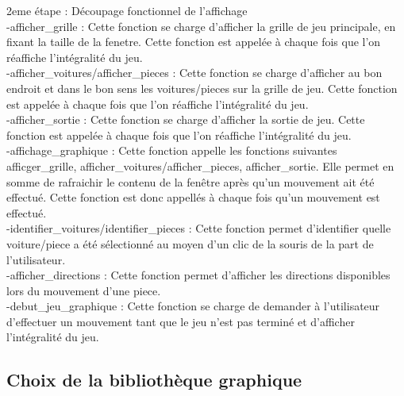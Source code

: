 \documentclass[20pt]{article}
\begin{document}
2eme étape : Découpage fonctionnel de l'affichage\\

-afficher\_grille : Cette fonction se charge d'afficher la grille de jeu principale, en fixant la taille de la fenetre. Cette fonction est appelée à chaque fois que l'on réaffiche l'intégralité du jeu.\\

-afficher\_voitures/afficher\_pieces : Cette fonction se charge d'afficher au bon endroit et dans le bon sens les voitures/pieces sur la grille de jeu. Cette fonction est appelée à chaque fois que l'on réaffiche l'intégralité du jeu.\\

-afficher\_sortie : Cette fonction se charge d'afficher la sortie de jeu. Cette fonction est appelée à chaque fois que l'on réaffiche l'intégralité du jeu.\\

-affichage\_graphique : Cette fonction appelle les fonctions suivantes afficger\_grille, afficher\_voitures/afficher\_pieces, afficher\_sortie. Elle permet en somme de rafraichir le contenu de la fenêtre après qu'un mouvement ait été effectué. Cette fonction est donc appellés à chaque fois qu'un mouvement est effectué.\\

-identifier\_voitures/identifier\_pieces : Cette fonction permet d'identifier quelle voiture/piece a été sélectionné au moyen d'un clic de la souris de la part de l'utilisateur.\\

-afficher\_directions : Cette fonction permet d'afficher les directions disponibles lors du mouvement d'une piece.\\

-debut\_jeu\_graphique : Cette fonction se charge de demander à l'utilisateur d'effectuer un mouvement tant que le jeu n'est pas terminé et d'afficher l'intégralité du jeu.\\

\subsection{Choix de la bibliothèque graphique}
\end{document}
